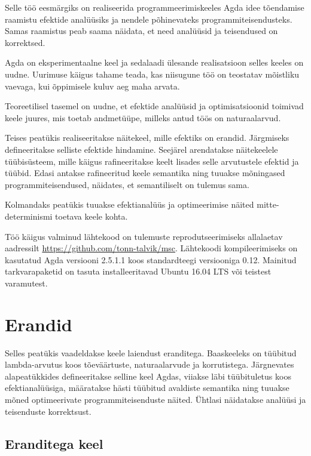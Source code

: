 \documentclass[a4paper,12pt]{article}
\begin{document}
Selle töö eesmärgiks on realiseerida programmeerimiskeeles Agda idee tõendamise
raamistu efektide analüüsiks ja nendele põhinevateks programmiteisendusteks.
Samas raamistus peab saama näidata, et need analüüsid ja teisendused on korrektsed.

Agda on eksperimentaalne keel ja sedalaadi ülesande realisatsioon selles keeles on uudne.
Uurimuse käigus tahame teada, kas niisugune töö on teostatav mõistliku vaevaga, kui õppimisele kuluv aeg maha arvata.

Teoreetilisel tasemel on uudne, et efektide analüüsid ja optimisatsioonid toimivad keele juures, mis toetab andmetüüpe, milleks antud töös on naturaalarvud. 

Teises peatükis realiseeritakse näitekeel, mille efektiks on erandid.
Järgmiseks defineeritakse selliste efektide hindamine.
Seejärel arendatakse näitekeelele tüübisüsteem, mille käigus rafineeritakse keelt lisades selle arvutustele efektid ja tüübid.
Edasi antakse rafineeritud keele semantika ning tuuakse mõningased programmiteisendused, näidates, et semantiliselt on tulemus sama.

Kolmandaks peatükis tuuakse efektianalüüs ja optimeerimise näited mitte-determinismi toetava keele kohta.

Töö käigus valminud lähtekood on tulemuste reprodutseerimiseks allalaetav aadressilt \url{https://github.com/tonn-talvik/msc}.
Lähtekoodi kompileerimiseks on kasutatud Agda versiooni 2.5.1.1 koos standardteegi versiooniga 0.12.
Mainitud tarkvarapaketid on tasuta installeeritavad Ubuntu 16.04 LTS või teistest varamutest.

\clearpage\vspace*{0pt}

\section{Erandid}\label{sec:exc}

Selles peatükis vaadeldakse keele laiendust eranditega. 
Baaskeeleks on tüübitud lambda-arvutus koos tõeväärtuste, naturaalarvude ja korrutistega.
Järgnevates alapeatükkides defineeritakse selline keel Agdas,
viiakse läbi tüübituletus koos efektianalüüsiga,
määratakse hästi tüübitud avaldiste semantika
ning tuuakse mõned optimeerivate programmiteisenduste näited.
Ühtlasi näidatakse analüüsi ja teisenduste korrektsust.

\subsection{Eranditega keel}\label{ssec:exc.raw}
\end{document}
